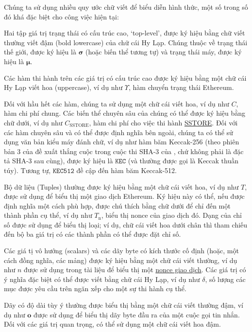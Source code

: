 \documentclass[9pt,oneside]{amsart}
\begin{document}
\begin{multicols}{2}
Chúng ta sử dụng nhiều quy ước chữ viết để biểu diễn hình thức, một số trong số đó khá đặc biệt cho công việc hiện tại:

Hai tập giá trị trạng thái có cấu trúc cao, `top-level', được ký hiệu bằng chữ viết thường viết đậm (bold lowercase) của chữ cái Hy Lạp. Chúng thuộc về trạng thái thế giới, được ký hiệu là $\boldsymbol{\sigma}$ (hoặc biến thể tương tự) và trạng thái máy, được ký hiệu là $\boldsymbol{\mu}$.

Các hàm thi hành trên các giá trị có cấu trúc cao được ký hiệu bằng một chữ cái Hy Lạp viết hoa (uppercase), ví dụ như \hyperlink{Upsilon_state_transition}{$\Upsilon$}, hàm chuyển trạng thái Ethereum.

Đối với hầu hết các hàm, chúng ta sử dụng một chữ cái viết hoa, ví dụ như $C$, hàm chi phí chung. Các biến thể chuyên sâu của chúng có thể được ký hiệu bằng chữ dưới, ví dụ như \hyperlink{C__SSTORE}{$C_\text{SSTORE}$}, hàm chi phí cho việc thi hành \hyperlink{SSTORE}{{\tiny SSTORE}}. Đối với các hàm chuyên sâu và có thể được định nghĩa bên ngoài, chúng ta có thể sử dụng văn bản kiểu máy đánh chữ, ví dụ như hàm băm Keccak-256 (theo phiên bản 3 của đề xuất thắng cuộc trong cuộc thi SHA-3 của \cite{Keccak}, chứ không phải là đặc tả SHA-3 sau cùng), được ký hiệu là $\texttt{KEC}$ (và thường được gọi là Keccak thuần túy). Tương tự, $\texttt{KEC512}$ đề cập đến hàm băm Keccak-512.

Bộ dữ liệu (Tuples) thường được ký hiệu bằng một chữ cái viết hoa, ví dụ như $T$, được sử dụng để biểu thị một giao dịch Ethereum. Ký hiệu này có thể, nếu được định nghĩa một cách phù hợp, được chú thích bằng chữ dưới để chỉ đến một thành phần cụ thể, ví dụ như \hyperlink{transaction_nonce}{$T_{\mathrm{n}}$}, biểu thị nonce của giao dịch đó. Dạng của chỉ số được sử dụng để biểu thị loại; ví dụ, chữ cái viết hoa dưới chân thì tham chiếu đến bộ ba giá trị có các thành phần có thể được đặt chỉ số.

Các giá tị vô hướng (scalars) và các dãy byte có kích thước cố định (hoặc, một cách đồng nghĩa, các mảng) được ký hiệu bằng một chữ cái viết thường, ví dụ như $n$ được sử dụng trong tài liệu để biểu thị một \hyperlink{transaction_nonce}{nonce giao dịch}. Các giá trị có ý nghĩa đặc biệt có thể được viết bằng chữ cái Hy Lạp, ví dụ như $\delta$, số lượng các mục được yêu cầu trên ngăn xếp cho một sự thi hành cụ thể.

Dãy có độ dài tùy ý thường được biểu thị bằng một chữ cái viết thường đậm, ví dụ như $\mathbf{o}$ được sử dụng để biểu thị dãy byte đầu ra của một cuộc gọi tin nhắn. Đối với các giá trị quan trọng, có thể sử dụng một chữ cái viết hoa đậm.


\end{multicols}
\end{document}
